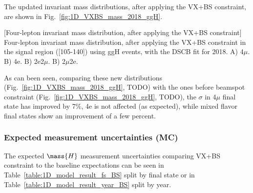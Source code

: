 The updated invariant mass distributions, after applying the VX+BS constraint, are shown in Fig.~\ref{fig:1D_VXBS_mass_2018_ggH}.
\begin{multiFigure}
    \centering
        [Four-lepton invariant mass distribution, after applying the VX+BS constraint]
        {Four-lepton invariant mass distribution, after applying the VX+BS constraint in the signal region ([105-140]\GeV) using ggH events, with the DSCB fit for 2018.
        \;A) 4$\mu$.    %
        \;B) 4e.
        \;B) 2e2$\mu$.
        \;B) 2$\mu$2e.}
    \label{fig:1D_VXBS_mass_2018_ggH}
\end{multiFigure}
As can been seen, comparing these new distributions (Fig.~\ref{fig:1D_VXBS_mass_2018_ggH}, TODO) with the ones before beamspot constraint (Fig.~\ref{fig:1D_VXBS_mass_2018_ggH}, TODO), the $\sigma$ in 4$\mu$ final state has improved by 7$\%$, 4e is not affected (as expected), while mixed flavor final states show an improvement of a few percent.

\subsubsection{Expected \mH measurement uncertainties (MC)}
The expected $\mass{H}$ measurement uncertainties comparing VX+BS constraint to the baseline expectations can be seen in Table~\ref{table:1D_model_result_fs_BS} split by final state or in Table~\ref{table:1D_model_result_year_BS} split by year.

